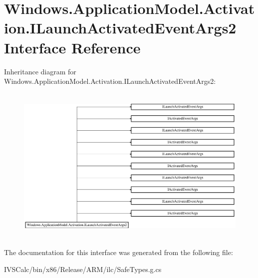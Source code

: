 \hypertarget{interface_windows_1_1_application_model_1_1_activation_1_1_i_launch_activated_event_args2}{}\section{Windows.\+Application\+Model.\+Activation.\+I\+Launch\+Activated\+Event\+Args2 Interface Reference}
\label{interface_windows_1_1_application_model_1_1_activation_1_1_i_launch_activated_event_args2}
Inheritance diagram for Windows.\+Application\+Model.\+Activation.\+I\+Launch\+Activated\+Event\+Args2\+:\begin{figure}[H]
\begin{center}
\leavevmode
\includegraphics[height=7.700000cm]{interface_windows_1_1_application_model_1_1_activation_1_1_i_launch_activated_event_args2}
\end{center}
\end{figure}


The documentation for this interface was generated from the following file\+:\begin{DoxyCompactItemize}
\item 
I\+V\+S\+Calc/bin/x86/\+Release/\+A\+R\+M/ilc/Safe\+Types.\+g.\+cs\end{DoxyCompactItemize}
